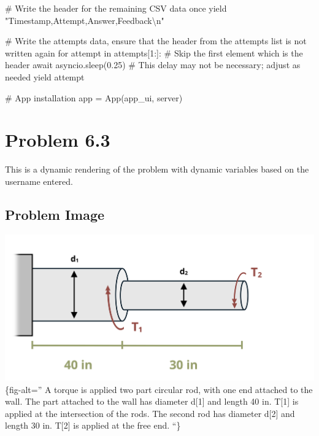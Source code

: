 \documentclass[
  letterpaper,
  DIV=11,
  numbers=noendperiod]{scrreprt}
\newenvironment{Shaded}{\begin{snugshade}}{\end{snugshade}}
\newcommand{\NormalTok}[1]{\textcolor[rgb]{0.00,0.23,0.31}{#1}}
\begin{document}
\begin{Shaded}
\begin{Highlighting}[]
\NormalTok{        \# Write the header for the remaining CSV data once}
\NormalTok{        yield "Timestamp,Attempt,Answer,Feedback\textbackslash{}n"}
        
\NormalTok{        \# Write the attempts data, ensure that the header from the attempts list is not written again}
\NormalTok{        for attempt in attempts[1:]:  \# Skip the first element which is the header}
\NormalTok{            await asyncio.sleep(0.25)  \# This delay may not be necessary; adjust as needed}
\NormalTok{            yield attempt}


\NormalTok{\# App installation}
\NormalTok{app = App(app\_ui, server)}
\end{Highlighting}
\end{Shaded}

\chapter*{Problem 6.3}\label{problem-6.3}


This is a dynamic rendering of the problem with dynamic variables based
on the username entered.

\section*{Problem Image}\label{problem-image-61}


\includegraphics{images/273.png}\{fig-alt='' A torque is applied two
part circular rod, with one end attached to the wall. The part attached
to the wall has diameter d{[}1{]} and length 40 in. T{[}1{]} is applied
at the intersection of the rods. The second rod has diameter d{[}2{]}
and length 30 in. T{[}2{]} is applied at the free end. ``\}
\end{document}
